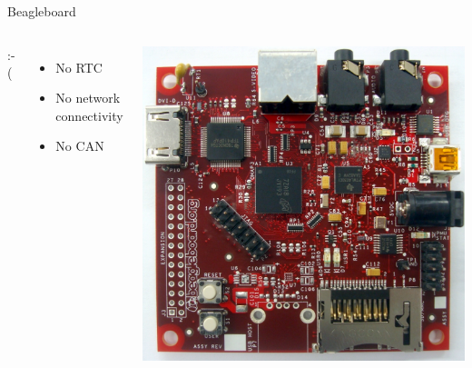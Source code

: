 \documentclass{beamer}
\begin{document}
\begin{frame}{Beagleboard}
\begin{columns}[c]

:-(
\begin{itemize}
\item No RTC
\item No network connectivity
\item No CAN
\end{itemize}

\includegraphics[width=\textwidth]{../img/beagleboard}

\end{columns}
\end{frame}
\end{document}
